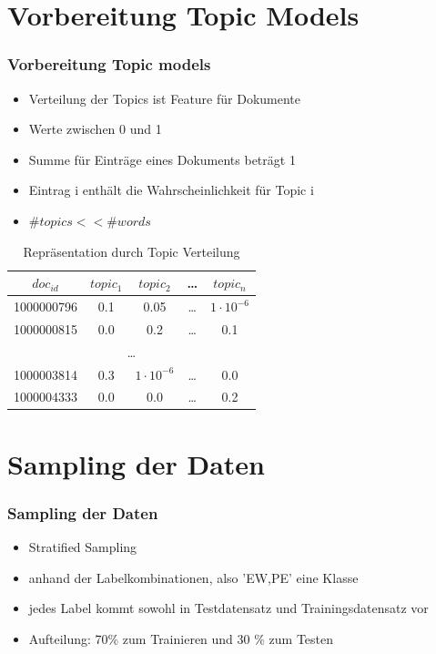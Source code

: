 \documentclass[12pt, xcolor=table]{beamer}
\begin{document}
\section{Vorbereitung Topic Models}
\begin{frame}
    \frametitle{Vorbereitung Topic models}
    \begin{itemize}
        \item Verteilung der Topics ist Feature für Dokumente
        \item Werte zwischen 0 und 1
        \item Summe für Einträge eines Dokuments beträgt 1
        \item Eintrag i enthält die Wahrscheinlichkeit für Topic i
        \item $\#topics << \#words$
    \end{itemize}
        \begin{table}
            \begin{tabular}{c|cccc}
                \tiny\textbf{$doc_{id}$} &\tiny \textbf{$topic_{1}$} &\tiny \textbf{$topic_{2}$} &\tiny \textbf{\dots} & \tiny \textbf{$topic_{n}$} \\
                \hline
                \tiny 1000000796 &\tiny 0.1 & \tiny 0.05 & \tiny  \dots  & \tiny $1 \cdot 10^{-6}$  \\
                \tiny 1000000815 &\tiny 0.0 & \tiny 0.2 & \tiny \dots  & \tiny 0.1 \\
                \multicolumn{5}{c}{\dots} \\
                \tiny 1000003814 &\tiny 0.3  & \tiny $1 \cdot 10^{-6}$ & \tiny  \dots  & \tiny 0.0 \\
                \tiny 1000004333 & \tiny 0.0 &\tiny 0.0 &\tiny  \dots & \tiny 0.2 \\
            \end{tabular}
            \caption*{Repräsentation durch Topic Verteilung}
        \end{table}
\end{frame}

\section{Sampling der Daten}
\begin{frame}
    \frametitle{Sampling der Daten}
    \begin{itemize}
        \item Stratified Sampling
        \item anhand der Labelkombinationen, also 'EW,PE' eine Klasse
        \item jedes Label kommt sowohl in Testdatensatz und Trainingsdatensatz vor
        \item Aufteilung: 70\% zum Trainieren und 30 \% zum Testen
    \end{itemize}
\end{frame}
\end{document}
